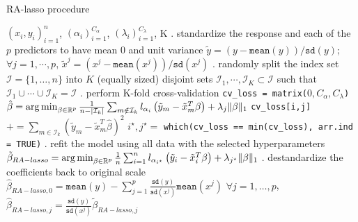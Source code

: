 \begin{algorithm}
\caption{RA-lasso procedure}\label{alg:ralasso}
\begin{algorithmic}
\Require $(x_i, y_i)_{i=1}^n$, $(\alpha_i)_{i=1}^{C_\alpha}$, $(\lambda_i)_{i=1}^{C_\lambda}$, K
. standardize the response and each of the $p$ predictors to have mean $0$ and unit variance
\State \quad $\tilde{y} = ( y - \texttt{mean}(y) ) / \texttt{sd}(y)$;
\State \quad $\forall j=1,\cdots,p$, \quad $\tilde{x}^j = ( x^j - \texttt{mean}(x^j) ) / \texttt{sd}(x^j)$
. randomly split the index set $\mathcal{I} = \{1,\dots,n\}$ into $K$ (equally sized) disjoint sets
\State \quad $\mathcal{I}_1, \cdots, \mathcal{I}_K \subset \mathcal{I}$ such that $\mathcal{I}_1 \cup \cdots \cup \mathcal{I}_K = \mathcal{I}$
. perform K-fold cross-validation
\State \quad \texttt{cv\_loss = matrix(}$0, C_\alpha, C_\lambda$\texttt{)}
\Indent
				\State $\hat{\beta} = \argmin_{\beta\in\mathbb{R}^p} 
						\frac{1}{n - |\mathcal{I}_k|}\sum_{m \notin \mathcal{I}_k} l_{\alpha_i} 
						\left( \tilde{y}_m - \tilde{x}_m^T\beta \right) + \lambda_j\|\beta\|_1$
				\State \texttt{cv\_loss[i,j]} $+= \sum_{m \in \mathcal{I}_k} 
												\left( \tilde{y}_m - \tilde{x}_m^T\hat{\beta} \right)^2$
			\EndFor
		\EndFor
	\EndFor
\EndIndent
\State \quad $i^\star, j^\star=$ \texttt{which(cv\_loss == min(cv\_loss), arr.ind = TRUE)}
. refit the model using all data with the selected hyperparameters
\State \quad $\tilde{\beta}_{RA-lasso} = \argmin_{\beta\in\mathbb{R}^p} \frac{1}{n}\sum_{i=1}^n l_{\alpha_{i^\star}} \left( \tilde{y}_i - \tilde{x}_i^T\beta \right) + \lambda_{j^\star}\|\beta\|_1$
. destandardize the coefficients back to original scale
\State \quad $\hat{\beta}_{RA-lasso, 0} = \texttt{mean}(y) - \sum_{j=1}^p \frac{\texttt{sd}(y)}{\texttt{sd}(x^j)}\texttt{mean}(x^j)$ 
\State \quad $\forall j = 1,\dots,p$, \quad $\hat{\beta}_{RA-lasso, j} = \frac{\texttt{sd}(y)}{\texttt{sd}(x^j)}\tilde{\beta}_{RA-lasso, j}$ 
\end{algorithmic}
\end{algorithm}